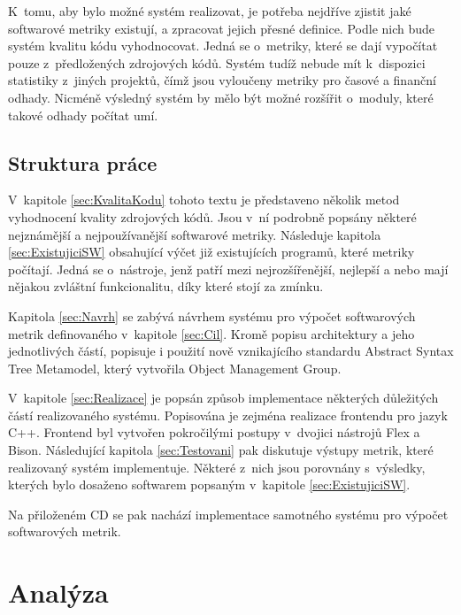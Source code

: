 \documentclass[11pt,twoside,a4paper]{book}
\begin{document}
K~tomu, aby bylo možné systém realizovat, je potřeba nejdříve zjistit jaké softwarové metriky existují, a zpracovat
jejich přesné definice. Podle nich bude systém kvalitu kódu vyhodnocovat. Jedná se o~metriky, které se dají
vypočítat pouze z~předložených zdrojových kódů. Systém tudíž nebude mít k~dispozici statistiky z~jiných projektů,
čímž jsou vyloučeny metriky pro časové a finanční odhady. Nicméně výsledný systém by mělo být možné rozšířit o~moduly,
které takové odhady počítat umí.

\section{Struktura práce}
V~kapitole \ref{sec:KvalitaKodu} tohoto textu je představeno několik metod vyhodnocení kvality zdrojových kódů.
Jsou v~ní podrobně popsány některé nejznámější a nejpoužívanější softwarové metriky.
Následuje kapitola \ref{sec:ExistujiciSW} obsahující výčet již existujících programů,
které metriky počítají. Jedná se o~nástroje, jenž patří mezi nejrozšířenější, nejlepší a
nebo mají nějakou zvláštní funkcionalitu, díky které stojí za zmínku.

Kapitola \ref{sec:Navrh} se zabývá návrhem systému pro výpočet softwarových metrik definovaného v~kapitole \ref{sec:Cil}.
Kromě popisu architektury a jeho jednotlivých částí, popisuje i použití nově vznikajícího standardu Abstract Syntax Tree Metamodel,
který vytvořila Object Management Group.

V~kapitole \ref{sec:Realizace} je popsán způsob implementace některých důležitých částí realizovaného systému. Popisována je
zejména realizace frontendu pro jazyk C++. Frontend byl vytvořen pokročilými postupy v~dvojici nástrojů Flex a Bison. Následující
kapitola \ref{sec:Testovani} pak diskutuje výstupy metrik, které realizovaný systém implementuje. Některé z~nich jsou porovnány s~výsledky,
kterých bylo dosaženo softwarem popsaným v~kapitole \ref{sec:ExistujiciSW}.

Na přiloženém CD se pak nachází implementace samotného systému pro výpočet softwarových metrik.


\chapter{Analýza}
\end{document}
